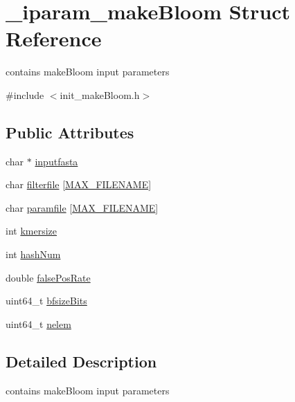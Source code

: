 \hypertarget{struct__iparam__makeBloom}{}\section{\+\_\+iparam\+\_\+make\+Bloom Struct Reference}
\label{struct__iparam__makeBloom}


contains make\+Bloom input parameters  




{\ttfamily \#include $<$init\+\_\+make\+Bloom.\+h$>$}

\subsection*{Public Attributes}
\begin{DoxyCompactItemize}
\item 
char $\ast$ \mbox{\hyperlink{struct__iparam__makeBloom_aaefb007647f548e8f3ffcb5fc83b7040}{inputfasta}}
\item 
char \mbox{\hyperlink{struct__iparam__makeBloom_aa3f7d0ba452807285408a70afbb5947b}{filterfile}} \mbox{[}\mbox{\hyperlink{defines_8h_abe0ec333b60117063f9b9fd9f849cb08}{M\+A\+X\+\_\+\+F\+I\+L\+E\+N\+A\+ME}}\mbox{]}
\item 
char \mbox{\hyperlink{struct__iparam__makeBloom_a8cf429229a99acfab0ce48046f42dfac}{paramfile}} \mbox{[}\mbox{\hyperlink{defines_8h_abe0ec333b60117063f9b9fd9f849cb08}{M\+A\+X\+\_\+\+F\+I\+L\+E\+N\+A\+ME}}\mbox{]}
\item 
int \mbox{\hyperlink{struct__iparam__makeBloom_a6f25cccf64d8ccdad252dcc1a99f0015}{kmersize}}
\item 
int \mbox{\hyperlink{struct__iparam__makeBloom_a0e8c97b918d06b17856569ede06bb2d9}{hash\+Num}}
\item 
double \mbox{\hyperlink{struct__iparam__makeBloom_a45fea7e1c00758d18e42f92c3ec9e29e}{false\+Pos\+Rate}}
\item 
uint64\+\_\+t \mbox{\hyperlink{struct__iparam__makeBloom_a8a0dac58ee8e9f1d8b29be730a5205a8}{bfsize\+Bits}}
\item 
uint64\+\_\+t \mbox{\hyperlink{struct__iparam__makeBloom_aad19a452126dca34f78bb961dc4cf233}{nelem}}
\end{DoxyCompactItemize}


\subsection{Detailed Description}
contains make\+Bloom input parameters 

